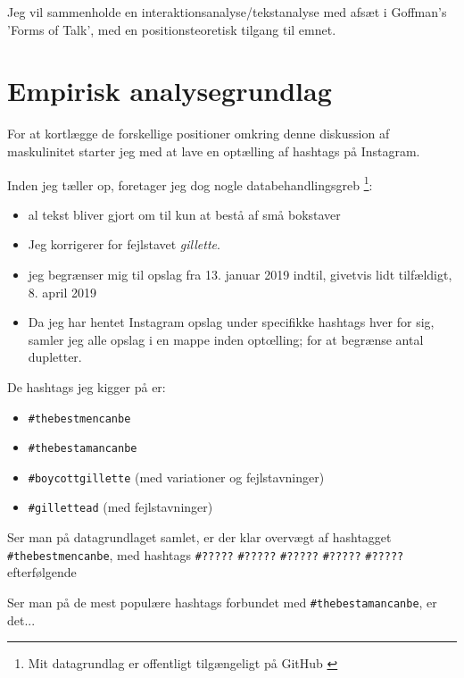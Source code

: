 Jeg vil sammenholde en interaktionsanalyse/tekstanalyse med afsæt
i Goffman's 'Forms of Talk', med en positionsteoretisk tilgang til
emnet. 


\section{Empirisk analysegrundlag}

For at kortlægge de forskellige positioner omkring denne 
diskussion af maskulinitet starter jeg med at lave en optælling af 
hashtags på Instagram.

Inden jeg tæller op, foretager jeg dog nogle databehandlingsgreb 
\footnote{Mit datagrundlag er offentligt tilgængeligt på GitHub 
\autocite{andersenEksamensopgaveSocialiseringOg2019}}:
\begin{itemize}
    \item
        al tekst bliver gjort om til kun at bestå af små bokstaver
    \item
        Jeg korrigerer for fejlstavet \textit{gillette}.
    \item
        jeg begrænser mig til opslag fra 13. januar 2019 indtil, 
        givetvis lidt tilfældigt, 8. april 2019
    \item
        Da jeg har hentet Instagram opslag under specifikke 
        hashtags hver for sig, samler jeg alle opslag i en mappe 
        inden optœlling; for at begrænse antal dupletter.
\end{itemize}

De hashtags jeg kigger på er:
\begin{itemize}
    \item
        \texttt{\#thebestmencanbe}
    \item
        \texttt{\#thebestamancanbe}
    \item
        \texttt{\#boycottgillette} (med variationer og 
        fejlstavninger)
    \item
        \texttt{\#gillettead} (med fejlstavninger)
\end{itemize}

Ser man på datagrundlaget samlet, er der klar overvægt af 
hashtagget \texttt{\#thebestmencanbe}, med hashtags
\texttt{\#?????} \texttt{\#?????} \texttt{\#?????}
\texttt{\#?????} \texttt{\#?????} efterfølgende

Ser man på de mest populære
hashtags forbundet med \texttt{\#thebestamancanbe}, er det...


